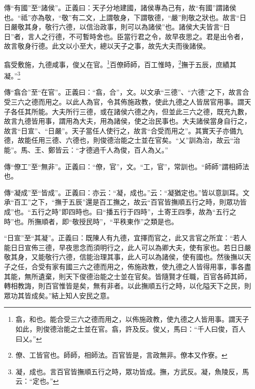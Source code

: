 {\noindent\zhuan{}\fzbyks 傳“有國”至“諸侯”。正義曰：天子分地建國，諸侯專為己有，故“有國”謂諸侯也。“祗”亦為敬，“敬”有二文，上謂敬身，下謂敬德，“嚴”則敬之狀也。故言“日日嚴敬其身，敬行六德，以信治政事，則可以為諸侯”也。諸侯大夫皆言“日日”者，言人之行德，不可暫時舍也。臣當行君之令，故早夜思之。君是出令者，故言敬身行德。此文以小至大，總以天子之事，故先大夫而後諸侯。 \par}

翕受敷施，九德咸事，俊乂在官。\footnote{翕，和也。能合受三六之德而用之，以佈施政教，使九德之人皆用事。謂天子如此，則俊德治能之士並在官。翕，許及反。俊乂，馬曰：“千人曰俊，百人曰乂。”}百僚師師，百工惟時，\footnote{僚、工皆官也。師師，相師法。百官皆是，言政無非。僚本又作寮。}撫于五辰，庶績其凝。”\footnote{凝，成也。言百官皆撫順五行之時，眾功皆成。撫，方武反。凝，魚陵反，馬云：“定也。”}

{\noindent\zhuan{}\fzbyks 傳“翕合”至“在官”。正義曰：“翕，合”，文。以文承“三德”、“六德”之下，故言合受三六之德而用之。以此人為官，令其佈施政教，使此九德之人皆居官用事。謂天子各任其所能。大夫所行三德，或在諸侯六德之內，但並此三六之德，既充九數，故言九德皆用事，謂用為大夫，用為諸侯，使之治民事也。大夫諸侯當身自行之，故言“日宣”、“日嚴”。天子當任人使行之，故言“合受而用之”。其實天子亦備九德，故能任用三德、六德也，則俊德治能之士並在官矣。“乂”訓為治，故云“治能”。馬、王、鄭皆云：“才德過千人為俊，百人為乂。” \par}

{\noindent\zhuan{}\fzbyks 傳“僚工”至“無非”。正義曰：“僚，官”，文。“工，官”，常訓也。“師師”謂相師法也。 \par}

{\noindent\zhuan{}\fzbyks 傳“凝成”至“皆成”。正義曰：亦云：“凝，成也。”云：“凝猶定也。”皆以意訓耳。文承“百工”之下，“撫于五辰”還是百工撫之，故云“百官皆撫順五行之時，則眾功皆成”也。“五行之時”即四時也。曰“播五行于四時”，土寄王四季，故為“五行之時”也。所撫順者，即“敬授民時”，“平秩東作”之類是也。 \par}

{\noindent\shu{}\fzkt “日宣”至“其凝”。正義曰：既陳人有九德，宜擇而官之，此又言官之所宜：“若人能日日宣佈三德，早夜思念而須明行之，此人可以為卿大夫，使有家也。若日日嚴敬其身，又能敬行六德，信能治理其事，此人可以為諸侯，使有國也。然後撫以天子之任，合受有家有國三六之德而用之，佈施政教，使九德之人皆得用事，事各盡其能，無所遺棄，則天下俊德治能之士並在官矣。皆隨賢才任職，百官各師其師，轉相教誨，則百官惟皆是矣，無有非者。以此撫順五行之時，以化隘天下之民，則眾功其皆成矣。”結上知人安民之意。 \par}


